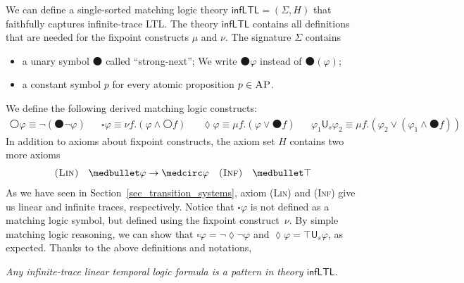 \documentclass[acmsmall,review,anonymous]{acmart}
\newcommand{\imp}{\to}
\newcommand{\sig}{\mathbb{\Sigma}}
\newcommand{\MLinfLTL}{\mathsf{infLTL}}
\newcommand{\prule}[1]{\textsc{(#1)}}
\newcommand{\AP}{\textsc{AP}}
\newcommand{\wnext}{{\medcirc}}
\newcommand{\snext}{{\medbullet}}
\newcommand{\always}{{\square}}
\newcommand{\eventually}{{\lozenge}}
\newcommand{\Us}{\mathbin{\mathsf{U}_s}}
\newcommand{\Inf}{\prule{Inf}\xspace}
\newcommand{\Lin}{\prule{Lin}\xspace}
\begin{document}
We can define 
a single-sorted matching logic theory 
$\MLinfLTL = (\sig, H)$ that
faithfully captures infinite-trace LTL.
The theory $\MLinfLTL$ contains all definitions
that are needed for the fixpoint constructs $\mu$ and $\nu$.
The signature $\Sigma$ contains
\begin{itemize}
\item a unary symbol $\snext$ called ``strong-next'';
      We write $\snext \varphi$ instead of $\snext(\varphi)$;
\item a constant symbol $p$ for every atomic proposition $p \in \AP$.
\end{itemize}
We define the following derived matching logic constructs:
\begin{align*}
\wnext \varphi \equiv \neg (\snext \neg \varphi)
&&
\always \varphi \equiv \nu f . (\varphi \wedge \wnext f)
&&
\eventually \varphi \equiv \mu f . (\varphi \vee \snext f)
&&
\varphi_1 \Us \varphi_2 \equiv \mu f . (\varphi_2 \vee (\varphi_1 \wedge \snext f))
\end{align*}
In addition to axioms about fixpoint constructs, the axiom set $H$ contains two more axioms
\begin{align*}
\prule{Lin} \quad \snext \varphi \imp \wnext \varphi
&&
\prule{Inf} \quad \snext \top
\end{align*}
As we have seen in Section~\ref{sec_transition_systems},
axiom \Lin and \Inf give us linear and infinite traces, respectively. 
Notice that $\always \varphi$ is not defined as a matching logic symbol, 
but defined using the fixpoint construct~$\nu$.
By simple matching logic reasoning, we can show that
$
\always \varphi = \neg \eventually \neg \varphi
$
and 
$
\eventually \varphi = \top \Us \varphi
$, as expected.
Thanks to the above definitions and notations,
\begin{center}
\emph{Any infinite-trace linear temporal logic formula is a pattern
in theory $\MLinfLTL$.}
\end{center}
%
\end{document}
